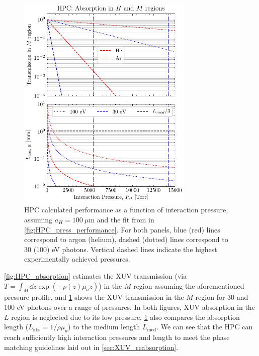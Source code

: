 \begin{figure}
	\centering
	\includegraphics[width=0.75\textwidth]{figures/chap3/HPC-gas-flow-int-length.pdf}
	\caption{HPC calculated performance as a function of interaction pressure, assuming $a_H = 100 \ \mu \textrm{m}$ and the fit from in  \cref{fig:HPC_press_performance}. For both panels, blue (red) lines correspond to argon (helium), dashed (dotted) lines correspond to 30 (100) eV photons. Vertical dashed lines indicate the highest experimentally achieved pressures.}
	\label{fig:HPC-gas-flow-int-length}
\end{figure}

\cref{fig:HPC_absorption} estimates the XUV transmission (via $T = \int_M \dd{z} \exp (- \rho(z) \mu_a z )$) in the $M$ region assuming the aforementioned pressure profile, and \cref{fig:HPC-gas-flow-int-length} shows the XUV transmission in the $M$ region for 30 and 100 eV photons over a range of pressures. In both figures, XUV absorption in the $L$ region is neglected due to its low pressure. \cref{fig:HPC-gas-flow-int-length} also compares the absorption length ($L_{\textrm{abs}} = 1 / \rho \mu_a$) to the medium length $L_{\textrm{med}}$. We can see that the HPC can reach sufficiently high interaction pressures and length to meet the phase matching guidelines laid out in \cref{sec:XUV_reabsorption}.

